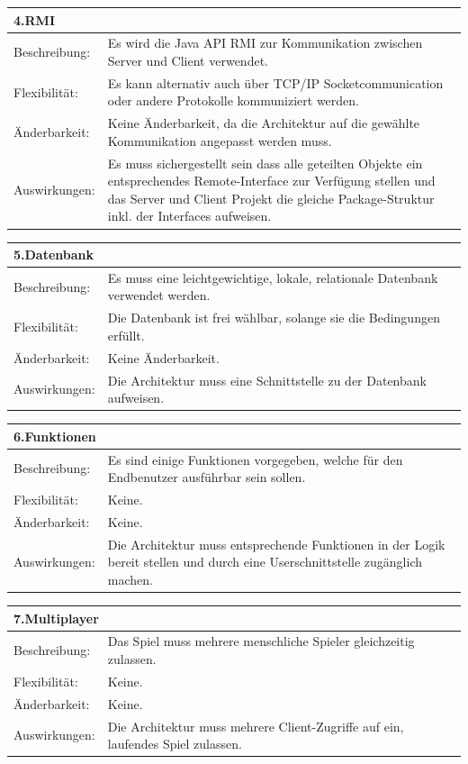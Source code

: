 \documentclass[fontsize=12pt,paper=a4,twoside]{scrartcl}
\begin{document}
\begin{tabular}{|p{3cm}|p{10cm}|}
	\hline
	\multicolumn{2}{|p{10cm}|}{\textbf{4.RMI}}\\
	\hline
	Beschreibung:&Es wird die Java API RMI zur Kommunikation zwischen Server und Client verwendet.\\
	\hline
	Flexibilität:&Es kann alternativ auch über TCP/IP Socketcommunication oder andere Protokolle kommuniziert werden.\\
	\hline
	Änderbarkeit:&Keine Änderbarkeit, da die Architektur auf die gewählte Kommunikation angepasst werden muss.\\
	\hline
	Auswirkungen:&Es muss sichergestellt sein dass alle geteilten Objekte ein entsprechendes Remote-Interface zur Verfügung stellen und das Server und Client Projekt die gleiche Package-Struktur inkl. der Interfaces aufweisen.\\
	\hline
\end{tabular}

\begin{tabular}{|p{3cm}|p{10cm}|}
	\hline
	\multicolumn{2}{|p{10cm}|}{\textbf{5.Datenbank}}\\
	\hline
	Beschreibung:&Es muss eine leichtgewichtige, lokale, relationale Datenbank verwendet werden.\\
	\hline
	Flexibilität:&Die Datenbank ist frei wählbar, solange sie die Bedingungen erfüllt.\\
	\hline
	Änderbarkeit:&Keine Änderbarkeit.\\
	\hline
	Auswirkungen:&Die Architektur muss eine Schnittstelle zu der Datenbank aufweisen.\\
	\hline
\end{tabular}

\begin{tabular}{|p{3cm}|p{10cm}|}
	\hline
	\multicolumn{2}{|p{10cm}|}{\textbf{6.Funktionen}}\\
	\hline
	Beschreibung:&Es sind einige Funktionen vorgegeben, welche für den Endbenutzer ausführbar sein sollen.\\
	\hline
	Flexibilität:&Keine.\\
	\hline
	Änderbarkeit:&Keine.\\
	\hline
	Auswirkungen:&Die Architektur muss entsprechende Funktionen in der Logik bereit stellen und durch eine Userschnittstelle zugänglich machen.\\
	\hline
\end{tabular}

\begin{tabular}{|p{3cm}|p{10cm}|}
	\hline
	\multicolumn{2}{|p{10cm}|}{\textbf{7.Multiplayer}}\\
	\hline
	Beschreibung:&Das Spiel muss mehrere menschliche Spieler gleichzeitig zulassen.\\
	\hline
	Flexibilität:&Keine.\\
	\hline
	Änderbarkeit:&Keine.\\
	\hline
	Auswirkungen:&Die Architektur muss mehrere Client-Zugriffe auf ein, laufendes Spiel zulassen.\\
	\hline
\end{tabular}
\end{document}
